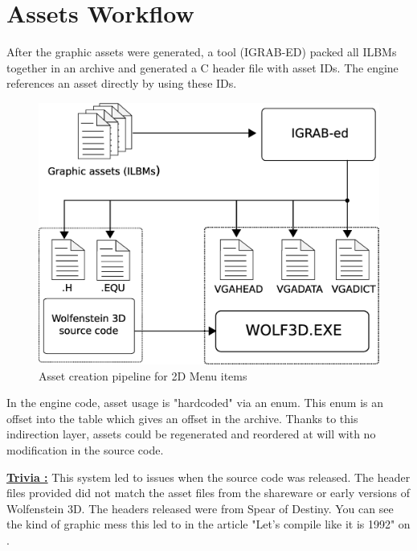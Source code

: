 \documentclass[book.tex]{subfiles}
\begin{document}
\section{Assets Workflow}
After the graphic assets were generated, a tool (IGRAB-ED) packed all ILBMs together in an archive and generated a C header file with asset IDs. The engine references an asset directly by using these IDs.\\
\begin{figure}[H]
\centering
 \includegraphics[width=.9\textwidth]{imgs/drawings/drawing_plain.eps}
 \caption{Asset creation pipeline for 2D Menu items}
\end{figure}
\par
\begin{minipage}{\textwidth}
 \par
 \end{minipage}
 
 In the engine code, asset usage is "hardcoded" via an enum. This enum is an offset into the 
  table which gives an offset in the  archive. Thanks to this indirection layer, assets could be regenerated and reordered at will with no modification in the source code.\\
 \par
 \begin{minipage}{\textwidth}
 \par
 \end{minipage}
\par
\textbf{\underline{Trivia :}} This system led to issues when the source code was released. The  header files provided did not match the asset files from the shareware or early versions of Wolfenstein 3D. The headers released were from Spear of Destiny. You can see the kind of graphic mess this led to in the article "Let's compile like it is 1992" on .\\
\end{document}
